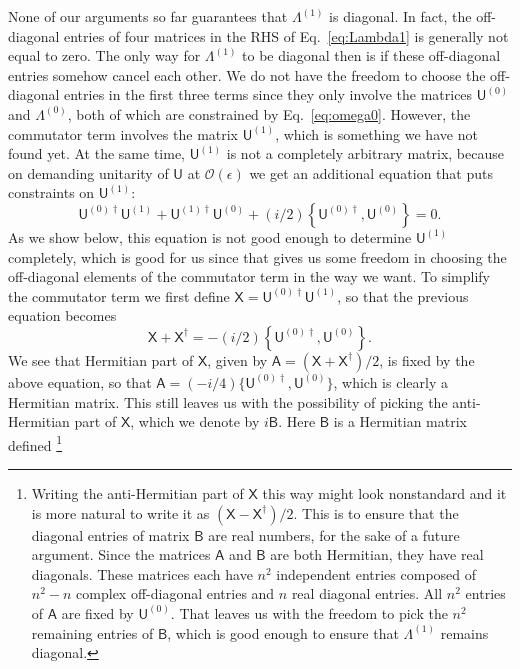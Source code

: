 None of our arguments so far guarantees that $\Lambda^{(1)}$ is diagonal.
In fact, the off-diagonal entries of four matrices in the RHS of Eq.~\eqref{eq:Lambda1} is generally not equal to zero.
The only way for $\Lambda^{(1)}$ to be diagonal then is if these off-diagonal entries somehow cancel each other.
We do not have the freedom to choose the off-diagonal entries in the first three terms since they only involve the matrices $\mathsf{U}^{(0)}$ and $\Lambda^{(0)}$, both of which are constrained by Eq.~\eqref{eq:omega0}.
However, the commutator term involves the matrix $\mathsf{U}^{(1)}$, which is something we have not found yet.
At the same time, $\mathsf{U}^{(1)}$ is not a completely arbitrary matrix, because on demanding unitarity of $\mathsf{U}$ at $\mathcal{O}(\epsilon)$ we get an additional equation that puts constraints on $\mathsf{U}^{(1)}$:
%
\begin{equation}
  \mathsf{U}^{(0)\dagger}\mathsf{U}^{(1)} + \mathsf{U}^{(1)\dagger}\mathsf{U}^{(0)} + (i/2)\left\{\mathsf{U}^{(0)\dagger}, \mathsf{U}^{(0)}\right\}= 0.
  \label{eq:unitarity}
\end{equation}
%
As we show below, this equation is not good enough to determine $\mathsf{U}^{(1)}$ completely, which is good for us since that gives us some freedom in choosing the off-diagonal elements of the commutator term in the way we want.
To simplify the commutator term we first define $\mathsf{X} = \mathsf{U}^{(0)\dagger}\mathsf{U}^{(1)}$, so that the previous equation becomes
%
\begin{equation}
  \mathsf{X} + \mathsf{X}^{\dagger} = -(i/2)\left\{\mathsf{U}^{(0)\dagger}, \mathsf{U}^{(0)}\right\}.
\end{equation}
%
We see that Hermitian part of $\mathsf{X}$, given by $\mathsf{A} = (\mathsf{X} + \mathsf{X}^{\dagger})/2$, is fixed by the above equation, so that $\mathsf{A} = (-i/4)\{\mathsf{U}^{(0)\dagger},\mathsf{U}^{(0)}\}$, which is clearly a Hermitian matrix.
This still leaves us with the possibility of picking the anti-Hermitian part of $\mathsf{X}$, which we denote by $i\mathsf{B}$. Here $\mathsf{B}$ is a Hermitian matrix defined%
\footnote{%
  Writing the anti-Hermitian part of $\mathsf{X}$ this way might look nonstandard and it is more natural to write it as $(\mathsf{X} - \mathsf{X}^{\dagger})/2$.
  This is to ensure that the diagonal entries of matrix $\mathsf{B}$ are real numbers, for the sake of a future argument.
Since the matrices $\mathsf{A}$ and $\mathsf{B}$ are both Hermitian, they have real diagonals.
  These matrices each have $n^{2}$ independent entries composed of $n^{2} - n$ complex off-diagonal entries and $n$ real diagonal entries.
  All $n^{2}$ entries of $\mathsf{A}$ are fixed by $\mathsf{U}^{(0)}$.
  That leaves us with the freedom to pick the $n^{2}$ remaining entries of $\mathsf{B}$, which is good enough to ensure that $\Lambda^{(1)}$ remains diagonal.
}
